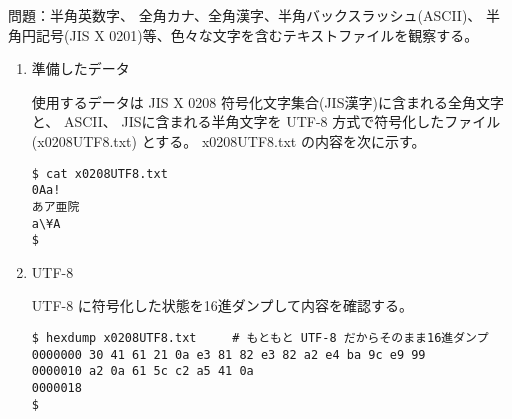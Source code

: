 \documentclass[a4j,dvipdfmx]{jarticle}
\begin{document}
\def\lstlistingname{リスト}

問題：半角英数字、
全角カナ、全角漢字、半角バックスラッシュ(ASCII)、
半角円記号(JIS X 0201)等、色々な文字を含むテキストファイルを観察する。

\begin{enumerate}
\item 準備したデータ

使用するデータは JIS X 0208 符号化文字集合(JIS漢字)に含まれる全角文字と、
ASCII、 JISに含まれる半角文字を UTF-8 方式で符号化したファイル(x0208UTF8.txt)
とする。
x0208UTF8.txt の内容を次に示す。

\begin{lstlisting}
$ cat x0208UTF8.txt 
0Aa!
あア亜院
a\¥A
$
\end{lstlisting}

\item UTF-8

UTF-8 に符号化した状態を16進ダンプして内容を確認する。

\begin{lstlisting}
$ hexdump x0208UTF8.txt     # もともと UTF-8 だからそのまま16進ダンプ
0000000 30 41 61 21 0a e3 81 82 e3 82 a2 e4 ba 9c e9 99
0000010 a2 0a 61 5c c2 a5 41 0a                        
0000018
$


\end{lstlisting}
\end{enumerate}
\end{document}
